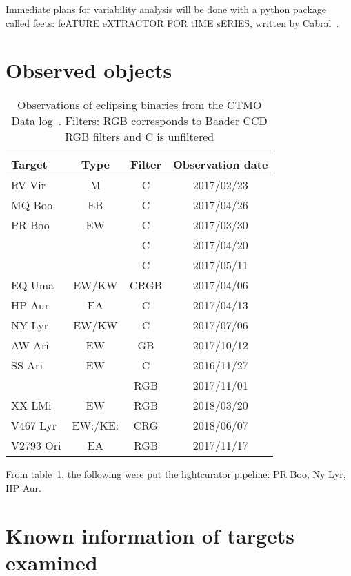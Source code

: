Immediate plans for variability analysis will be done with a python package 
called feets: feATURE eXTRACTOR FOR tIME sERIES,
written by Cabral~\cite{cabral_2018}. 


\section{Observed objects}
\begin{table}
    \centering
    \begin{tabular}[h]{l c c c}
    \toprule
    Target      & Type  & Filter    & Observation date \\ \bottomrule
    RV Vir      & M     & C         & 2017/02/23 \\ \midrule
    MQ Boo      & EB    & C         & 2017/04/26 \\ \midrule
    PR Boo      & EW    & C         & 2017/03/30 \\ \midrule
                &       & C         & 2017/04/20 \\ \midrule
                &       & C         & 2017/05/11 \\ \midrule
    EQ Uma      & EW/KW & CRGB      & 2017/04/06 \\ \midrule
    HP Aur      & EA    & C         & 2017/04/13 \\ \midrule
    NY Lyr      & EW/KW & C         & 2017/07/06 \\ \midrule
    AW Ari      & EW    & GB        & 2017/10/12 \\ \midrule
    SS Ari      & EW    & C         & 2016/11/27 \\ \midrule
                &       & RGB       & 2017/11/01 \\ \midrule
    XX LMi      & EW    & RGB       & 2018/03/20 \\ \midrule
    V467 Lyr    & EW:/KE:& CRG   & 2018/06/07 \\ \midrule
    V2793 Ori   & EA    & RGB   & 2017/11/17 \\
    \bottomrule
    \end{tabular}
    \caption{Observations of eclipsing binaries from the CTMO Data log~\protect\cite{richard_2019b}. Filters: RGB corresponds to Baader CCD RGB filters and C is unfiltered}
\label{tab:observations}
\end{table}
From table~\ref{tab:observations}, the following were put the lightcurator pipeline: PR Boo, Ny Lyr, HP Aur.


\section{Known information of targets examined}

